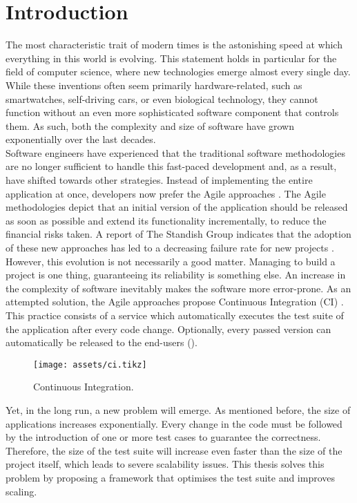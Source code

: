 \section{Introduction}
\noindent The most characteristic trait of modern times is the astonishing speed at which everything in this world is evolving. This statement holds in particular for the field of computer science, where new technologies emerge almost every single day. While these inventions often seem primarily hardware-related, such as smartwatches, self-driving cars, or even biological technology, they cannot function without an even more sophisticated software component that controls them. As such, both the complexity and size of software have grown exponentially over the last decades.\\

\noindent Software engineers have experienced that the traditional software methodologies are no longer sufficient to handle this fast-paced development and, as a result, have shifted towards other strategies. Instead of implementing the entire application at once, developers now prefer the Agile approaches \cite{beck2001agile}. The Agile methodologies depict that an initial version of the application should be released as soon as possible and extend its functionality incrementally, to reduce the financial risks taken. A report of The Standish Group indicates that the adoption of these new approaches has led to a decreasing failure rate for new projects \cite{standish2015chaos}.\\

\noindent However, this evolution is not necessarily a good matter. Managing to build a project is one thing, guaranteeing its reliability is something else. An increase in the complexity of software inevitably makes the software more error-prone. As an attempted solution, the Agile approaches propose Continuous Integration (CI) \cite{SmartJenkinsDefinitive}. This practice consists of a service which automatically executes the test suite of the application after every code change. Optionally, every passed version can automatically be released to the end-users ().

\begin{figure}[h!]
	\centering
	\texttt{[image: assets/ci.tikz]}
	\caption{Continuous Integration.}
	\label{fig:ext-en-ci}
\end{figure}

\noindent Yet, in the long run, a new problem will emerge. As mentioned before, the size of applications increases exponentially. Every change in the code must be followed by the introduction of one or more test cases to guarantee the correctness. Therefore, the size of the test suite will increase even faster than the size of the project itself, which leads to severe scalability issues. This thesis solves this problem by proposing a framework that optimises the test suite and improves scaling.\\